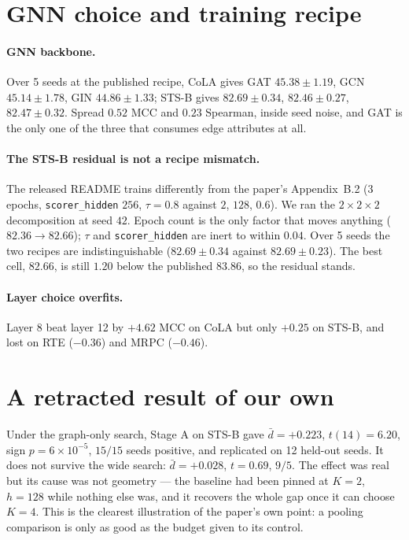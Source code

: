 \documentclass{article}
\begin{document}
\section{GNN choice and training recipe}
\label{app:factorial}

\paragraph{GNN backbone.} Over 5 seeds at the published recipe, CoLA gives GAT
$45.38 \pm 1.19$, GCN $45.14 \pm 1.78$, GIN $44.86 \pm 1.33$; STS-B gives
$82.69 \pm 0.34$, $82.46 \pm 0.27$, $82.47 \pm 0.32$. Spread $0.52$ MCC and
$0.23$ Spearman, inside seed noise, and GAT is the only one of the three that
consumes edge attributes at all.

\paragraph{The STS-B residual is not a recipe mismatch.} The released README
trains differently from the paper's Appendix~B.2 (3 epochs,
\texttt{scorer\_hidden} $256$, $\tau = 0.8$ against $2$, $128$, $0.6$). We ran
the $2\times2\times2$ decomposition at seed $42$. Epoch count is the only factor
that moves anything ($82.36 \rightarrow 82.66$); $\tau$ and
\texttt{scorer\_hidden} are inert to within $0.04$. Over 5 seeds the two recipes
are indistinguishable ($82.69 \pm 0.34$ against $82.69 \pm 0.23$). The best
cell, $82.66$, is still $1.20$ below the published $83.86$, so the residual
stands.

\paragraph{Layer choice overfits.} Layer 8 beat layer 12 by $+4.62$ MCC on CoLA
but only $+0.25$ on STS-B, and lost on RTE ($-0.36$) and MRPC ($-0.46$).

\section{A retracted result of our own}
\label{app:narrow}

Under the graph-only search, Stage A on STS-B gave $\bar{d}=+0.223$,
$t(14)=6.20$, sign $p=6\times10^{-5}$, $15/15$ seeds positive, and replicated on
12 held-out seeds. It does not survive the wide search: $\bar{d}=+0.028$,
$t=0.69$, $9/5$. The effect was real but its cause was not geometry --- the
baseline had been pinned at $K=2$, $h=128$ while nothing else was, and it
recovers the whole gap once it can choose $K=4$. This is the clearest
illustration of the paper's own point: a pooling comparison is only as good as
the budget given to its control.
\end{document}
